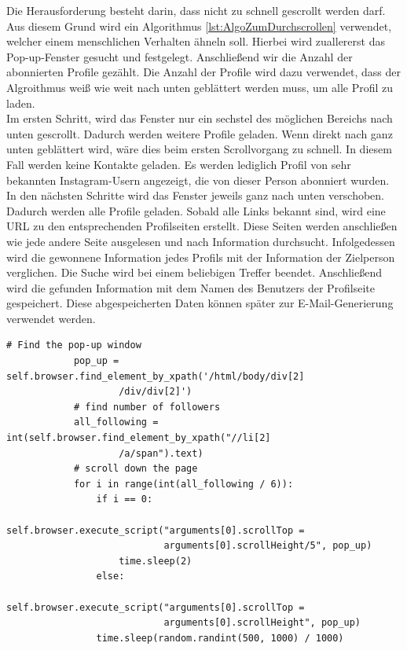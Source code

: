 		Die Herausforderung besteht darin, dass nicht zu schnell gescrollt werden darf. Aus diesem Grund wird ein Algorithmus \ref{lst:AlgoZumDurchscrollen} verwendet, welcher einem menschlichen Verhalten ähneln soll. Hierbei wird zuallererst das Pop-up-Fenster gesucht und festgelegt. Anschließend wir die Anzahl der abonnierten Profile gezählt. Die Anzahl der Profile wird dazu verwendet, dass der Algroithmus weiß wie weit nach unten geblättert werden muss, um alle Profil zu laden.\\
		Im ersten Schritt, wird das Fenster nur ein sechstel des möglichen Bereichs nach unten gescrollt. Dadurch werden weitere Profile geladen. Wenn direkt nach ganz unten geblättert wird, wäre dies beim ersten Scrollvorgang zu schnell. In diesem Fall werden keine Kontakte geladen. Es werden lediglich Profil von sehr bekannten Instagram-Usern angezeigt, die von dieser Person abonniert wurden.\\
		In den nächsten Schritte wird das Fenster jeweils ganz nach unten verschoben. Dadurch werden alle Profile geladen. Sobald alle Links bekannt sind, wird eine URL zu den entsprechenden Profilseiten erstellt. Diese Seiten werden anschließen wie jede andere Seite ausgelesen und nach Information durchsucht. Infolgedessen wird die gewonnene Information jedes Profils mit der Information der Zielperson verglichen. Die Suche wird bei einem beliebigen Treffer beendet. Anschließend wird die gefunden Information mit dem Namen des Benutzers der Profilseite gespeichert. Diese abgespeicherten Daten können später zur E-Mail-Generierung verwendet werden.\\
		
		\begin{lstlisting}[caption=Herunterscrollen des Pop-up Fensters,label={lst:AlgoZumDurchscrollen}]
			# Find the pop-up window
			pop_up = self.browser.find_element_by_xpath('/html/body/div[2]
					/div/div[2]')        
			# find number of followers
			all_following = int(self.browser.find_element_by_xpath("//li[2]
					/a/span").text)
			# scroll down the page
			for i in range(int(all_following / 6)):
				if i == 0:
					self.browser.execute_script("arguments[0].scrollTop = 
							arguments[0].scrollHeight/5", pop_up)
					time.sleep(2)
				else:
					self.browser.execute_script("arguments[0].scrollTop = 
							arguments[0].scrollHeight", pop_up)
				time.sleep(random.randint(500, 1000) / 1000)
		\end{lstlisting}




